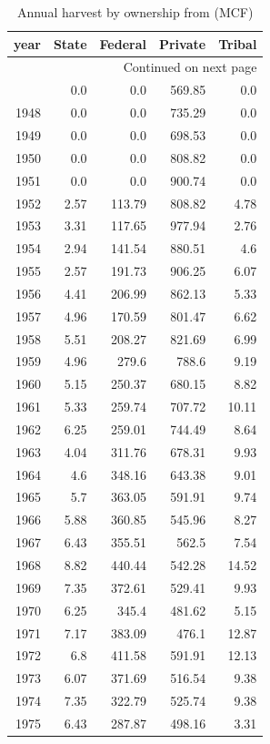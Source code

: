 \documentclass[a4paper]{article}
\begin{document}
\begin{longtable}{rrrrr}
\caption{Annual harvest by ownership from \citet{Mciver2012} (MCF)\label{tab:MandM}}
\\
year & State & Federal & Private & Tribal\\
\hline
\endhead
\hline\multicolumn{5}{r}{Continued on next page} \\
\endfoot
\endlastfoot
1947 & 0.0 & 0.0 & 569.85 & 0.0\\
1948 & 0.0 & 0.0 & 735.29 & 0.0\\
1949 & 0.0 & 0.0 & 698.53 & 0.0\\
1950 & 0.0 & 0.0 & 808.82 & 0.0\\
1951 & 0.0 & 0.0 & 900.74 & 0.0\\
1952 & 2.57 & 113.79 & 808.82 & 4.78\\
1953 & 3.31 & 117.65 & 977.94 & 2.76\\
1954 & 2.94 & 141.54 & 880.51 & 4.6\\
1955 & 2.57 & 191.73 & 906.25 & 6.07\\
1956 & 4.41 & 206.99 & 862.13 & 5.33\\
1957 & 4.96 & 170.59 & 801.47 & 6.62\\
1958 & 5.51 & 208.27 & 821.69 & 6.99\\
1959 & 4.96 & 279.6 & 788.6 & 9.19\\
1960 & 5.15 & 250.37 & 680.15 & 8.82\\
1961 & 5.33 & 259.74 & 707.72 & 10.11\\
1962 & 6.25 & 259.01 & 744.49 & 8.64\\
1963 & 4.04 & 311.76 & 678.31 & 9.93\\
1964 & 4.6 & 348.16 & 643.38 & 9.01\\
1965 & 5.7 & 363.05 & 591.91 & 9.74\\
1966 & 5.88 & 360.85 & 545.96 & 8.27\\
1967 & 6.43 & 355.51 & 562.5 & 7.54\\
1968 & 8.82 & 440.44 & 542.28 & 14.52\\
1969 & 7.35 & 372.61 & 529.41 & 9.93\\
1970 & 6.25 & 345.4 & 481.62 & 5.15\\
1971 & 7.17 & 383.09 & 476.1 & 12.87\\
1972 & 6.8 & 411.58 & 591.91 & 12.13\\
1973 & 6.07 & 371.69 & 516.54 & 9.38\\
1974 & 7.35 & 322.79 & 525.74 & 9.38\\
1975 & 6.43 & 287.87 & 498.16 & 3.31\\

\end{longtable}
\end{document}
